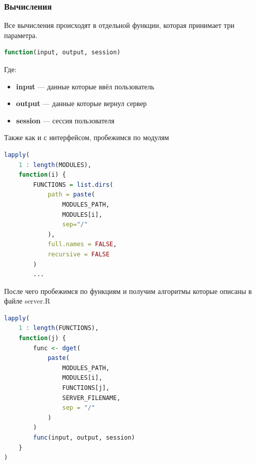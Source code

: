 \documentclass[14pt,a4paper]{scrartcl}
\begin{document}
    \subsubsection[Вычисления]{Вычисления}
    Все вычисления происходят в отдельной функции, которая принимает три параметра.
    \begin{lstlisting}[language=R]
function(input, output, session)
    \end{lstlisting}
    Где:
    \begin{itemize}
        \item \textbf{input}  --- данные которые ввёл пользователь
        \item \textbf{output} --- данные которые вернул сервер
        \item \textbf{session} --- сессия пользователя
    \end{itemize}

    Также как и с интерфейсом, пробежимся по модулям
    \begin{lstlisting}[language=R]
lapply(
    1 : length(MODULES),
    function(i) {
        FUNCTIONS = list.dirs(
            path = paste(
                MODULES_PATH,
                MODULES[i],
                sep="/"
            ),
            full.names = FALSE,
            recursive = FALSE
        )
        ...
    \end{lstlisting}
    После чего пробежимся по функциям и получим алгоритмы которые описаны в файле server.R
    \begin{lstlisting}[language=R]
lapply(
    1 : length(FUNCTIONS),
    function(j) {
        func <- dget(
            paste(
                MODULES_PATH,
                MODULES[i],
                FUNCTIONS[j],
                SERVER_FILENAME,
                sep = "/"
            )
        )
        func(input, output, session)
    }
)
    \end{lstlisting}

    \newpage
\end{document}
